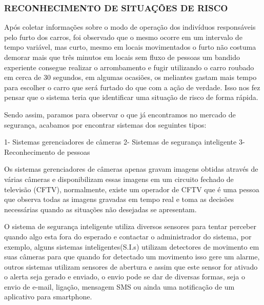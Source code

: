 \subsubsection{RECONHECIMENTO DE SITUAÇÕES DE RISCO}

    Após coletar informações sobre o modo de operação dos indivíduos responsáveis pelo furto dos carros, foi observado que o mesmo ocorre em um intervalo de tempo variável, mas curto, mesmo em locais movimentados o furto não costuma demorar mais que três minutos em locais sem fluxo de pessoas um bandido experiente consegue realizar o arrombamento e  fugir utilizando o carro roubado em cerca de 30 segundos, em algumas ocasiões, os meliantes gastam mais tempo para escolher o carro que será furtado do que com a ação de verdade. Isso nos fez pensar que o sistema teria que identificar uma situação de risco de forma rápida.
    
    Sendo assim, paramos para observar o que já encontramos no mercado de segurança, acabamos por encontrar sistemas dos seguintes tipos:
    
    1- Sistemas gerenciadores de câmeras
    2- Sistemas de segurança inteligente
    3- Reconhecimento de pessoas
    
    Os sistemas gerenciadores de câmeras apenas gravam imagens obtidas através de várias câmeras e disponibilizam essas imagens em um circuito fechado de televisão (CFTV), normalmente, existe um operador de CFTV que é uma pessoa que observa todas as imagens gravadas em tempo real e toma as decisões necessárias quando as situações não desejadas se apresentam.
    
    O sistema de segurança inteligente utiliza diversos sensores para tentar perceber quando algo esta fora do esperado e contactar o administrador do sistema, por exemplo, alguns sistemas inteligentes(S.I.s) utilizam detectores de movimento em suas câmeras para que quando for detectado um movimento isso gere um alarme, outros sistemas utilizam sensores de abertura e assim que este sensor for ativado o alerta seja gerado e enviado, o envio pode se dar de diversas formas, seja o envio de e-mail, ligação, mensagem SMS ou ainda uma notificação de um aplicativo para smartphone.
    
